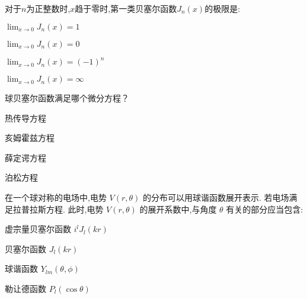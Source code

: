 \documentclass{njustexam}
\begin{document}


\begin{problem}
  对于$n$为正整数时,$x$趋于零时,第一类贝塞尔函数$J_n(x)$的极限是:

  \begin{abcd}
\item $\lim_{x \to 0} J_n(x) = 1$

\item $\lim_{x \to 0} J_n(x) = 0$

\item $\lim_{x \to 0} J_n(x) = (-1)^n$

\item $\lim_{x \to 0} J_n(x) = \infty$
 \end{abcd}
\end{problem}


\begin{problem}
  球贝塞尔函数满足哪个微分方程？ 

  \begin{abcd}
    \item 热传导方程
    \item 亥姆霍兹方程
    \item 薛定谔方程
    \item 泊松方程
  \end{abcd}
\end{problem}

\begin{problem}
  在一个球对称的电场中,电势 $V(r, \theta)$ 的分布可以用球谐函数展开表示.
  若电场满足拉普拉斯方程.
  此时,电势 $V(r, \theta)$ 的展开系数中,与角度 $\theta$ 有关的部分应当包含: 
  \begin{abcd}
  \item 虚宗量贝塞尔函数 $i^l J_l(kr)$
  \item 贝塞尔函数 $J_l(kr)$
  \item 球谐函数 $Y_{lm}(\theta, \phi)$
  \item 勒让德函数 $P_l(\cos\theta)$

  \end{abcd}
\end{problem}
\end{document}
